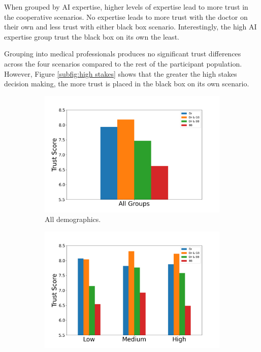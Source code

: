 \documentclass[manuscript,screen,review]{acmart}
\begin{document}
When grouped by AI expertise, higher levels of expertise lead to more trust in the cooperative scenarios. No expertise leads to more trust with the doctor on their own and less trust with either black box scenario. Interestingly, the high AI expertise group trust the black box on its own the least. 

Grouping into medical professionals produces no significant trust differences across the four scenarios compared to the rest of the participant population. However, Figure \ref{subfig:high stakes} shows that the greater the high stakes decision making, the more trust is placed in the black box on its own scenario.

\begin{figure}[ht]
  \begin{subfigure}[t]{.45\textwidth}
    \centering
    \includegraphics[width=\linewidth]{graphics/survey_averages/survey_average.png}
    \caption{All demographics.}
  \end{subfigure}
  \begin{subfigure}[t]{.45\textwidth}
    \centering
    \includegraphics[width=\linewidth]{graphics/survey_averages/survey_AI_grouped.png}

\end{subfigure}
\end{figure}
\end{document}
